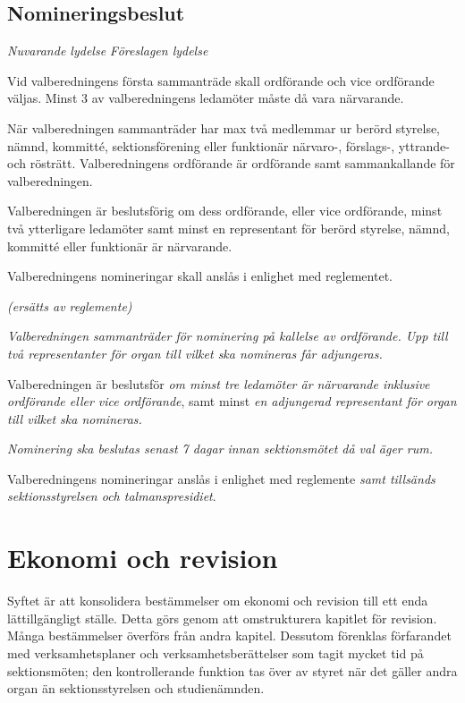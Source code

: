 \documentclass{article}
\newenvironment{lydelse}
    {\begin{paracol}{2}%
        \emph{Nuvarande lydelse}%
        \switchcolumn%
        \emph{Föreslagen lydelse}%
    \end{paracol}%
    \begin{enumerate}[label=\thesubsection.\arabic*]%
    \begin{paracol}{2}%
    }{\end{paracol}\end{enumerate}}
\begin{document}
\subsection{Nomineringsbeslut}
\begin{lydelse}
  \setcounter{section}{6}
  \setcounter{subsection}{3}
  \item Vid valberedningens första sammanträde skall ordförande och vice ordförande väljas. Minst 3 av valberedningens ledamöter måste då vara närvarande.
  \item När valberedningen sammanträder har max två medlemmar ur berörd styrelse, nämnd, kommitté, sektions\-förening eller funktionär närvaro-, för\-slags-, yttrande- och rösträtt. Valberedningens ordförande är ordförande samt sammankallande för valberedningen.
  \item Valberedningen är beslutsförig om dess ordförande, eller vice ordförande, minst två ytterligare
ledamöter samt minst en representant för berörd styrelse, nämnd, kommitté eller funktionär
är närvarande.
  \setcounter{subsection}{5}
  \setcounter{enumi}{0}
  \item Valberedningens nomineringar skall anslås i enlighet med reglementet.
  \switchcolumn
  \item[] \emph{(ersätts av reglemente)}
  \item \emph{Valberedningen sammanträder för nominering på kallelse av ordförande. Upp till två representanter för organ till vilket ska nomineras får adjungeras.}
  \item Valberedningen är beslutsför \emph{om minst tre ledamöter är närvarande inklusive ordförande eller vice ordförande}, samt minst \emph{en adjungerad representant för organ till vilket ska nomineras.}
  \item \emph{Nominering ska beslutas senast 7 dagar innan sektionsmötet då val äger rum.} 
  \label{S:ValBAnslaNomTid}
  \item Valberedningens nomineringar anslås i enlighet med reglemente \emph{samt tillsänds sektionsstyrelsen och talmanspresidiet}.
  \label{S:ValBAnslaNom}
\end{lydelse}
\setcounter{section}{13}
\setcounter{subsection}{2}

\section{Ekonomi och revision}
Syftet är att konsolidera bestämmelser om ekonomi och revision till ett enda lättillgängligt ställe.
Detta görs genom att omstrukturera kapitlet för revision.
Många bestämmelser överförs från andra kapitel.
Dessutom förenklas förfarandet med verksamhetsplaner och verksamhetsberättelser som tagit mycket tid på sektionsmöten; den kontrollerande funktion tas över av styret när det gäller andra organ än sektionsstyrelsen och studienämnden.
\end{document}

